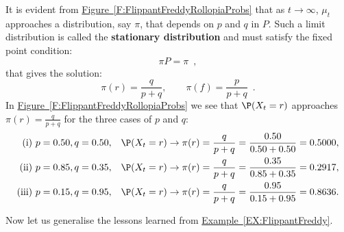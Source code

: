 \begin{example}
It is evident from \hyperref[F:FlippantFreddyRollopiaProbs]{Figure~\ref*{F:FlippantFreddyRollopiaProbs}} that as $t \to \infty$, $\mu_t$ approaches a distribution, say $\pi$, that depends on $p$ and $q$ in $P$.  Such a limit distribution is called the {\bf stationary distribution} and must satisfy the fixed point condition:
\[
\pi P = \pi \enspace ,
\]
that gives the solution:
\[
\pi(r) = \frac{q}{p+q}, \qquad \pi(f) = \frac{p}{p+q} \enspace .
\]
In \hyperref[F:FlippantFreddyRollopiaProbs]{Figure~\ref*{F:FlippantFreddyRollopiaProbs}} we see that $\P(X_t=r)$ approaches $\pi(r) = \frac{q}{p+q}$ for the three cases of $p$ and $q$:
\begin{align*}
\text{(i)}& \ p=0.50, q=0.50, & \P(X_t=r) & \to \pi(r) = \frac{q}{p+q} =  \frac{0.50}{0.50+0.50} = 0.5000,\\
\text{(ii)}& \  p=0.85, q=0.35, & \P(X_t=r) & \to \pi(r) = \frac{q}{p+q} =  \frac{0.35}{0.85+0.35} = 0.2917, \\
\text{(iii)}& \ p=0.15, q=0.95, & \P(X_t=r) & \to \pi(r) = \frac{q}{p+q} = \frac{0.95}{0.15+0.95} = 0.8636.
\end{align*}
\end{example}

Now let us generalise the lessons learned from \hyperref[EX:FlippantFreddy]{Example~\ref*{EX:FlippantFreddy}}.

